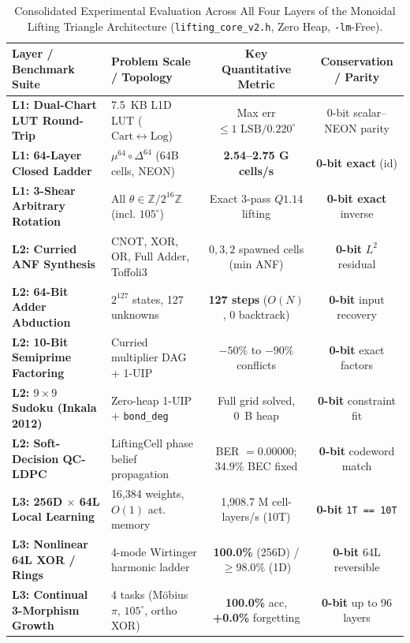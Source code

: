 \documentclass[11pt, a4paper]{article}
\begin{document}
\begin{table}[htbp]
\centering
\small
\caption{Consolidated Experimental Evaluation Across All Four Layers of the Monoidal Lifting Triangle Architecture (\texttt{lifting\_core\_v2.h}, Zero Heap, \texttt{-lm}-Free).}
\label{tab:master_eval}
\begin{tabularx}{\textwidth}{@{}lXcc@{}}
\toprule
\textbf{Layer / Benchmark Suite} & \textbf{Problem Scale / Topology} & \textbf{Key Quantitative Metric} & \textbf{Conservation / Parity} \\
\midrule
\textbf{L1: Dual-Chart LUT Round-Trip} & 7.5~KB L1D LUT ($\mathrm{Cart} \leftrightarrow \mathrm{Log}$) & Max err $\le 1\text{ LSB} / 0.220^\circ$ & 0-bit scalar--NEON parity \\
\textbf{L1: 64-Layer Closed Ladder} & $\mu^{64} \circ \Delta^{64}$ (64B cells, NEON) & \textbf{2.54--2.75 G cells/s} & \textbf{0-bit exact} ($\mathrm{id}$) \\
\textbf{L1: 3-Shear Arbitrary Rotation} & All $\theta \in \mathbb{Z}/2^{16}\mathbb{Z}$ (incl. $105^\circ$) & Exact 3-pass $Q1.14$ lifting & \textbf{0-bit exact} inverse \\
\midrule
\textbf{L2: Curried ANF Synthesis} & CNOT, XOR, OR, Full Adder, Toffoli3 & $0, 3, 2$ spawned cells (min ANF) & \textbf{0-bit} $L^2$ residual \\
\textbf{L2: 64-Bit Adder Abduction} & $2^{127}$ states, 127 unknowns & \textbf{127 steps} ($O(N)$, 0 backtrack) & \textbf{0-bit} input recovery \\
\textbf{L2: 10-Bit Semiprime Factoring} & Curried multiplier DAG + 1-UIP & $-50\%$ to $-90\%$ conflicts & \textbf{0-bit} exact factors \\
\textbf{L2: $9 \times 9$ Sudoku (Inkala 2012)} & Zero-heap 1-UIP + \texttt{bond\_deg} & Full grid solved, 0~B heap & \textbf{0-bit} constraint fit \\
\textbf{L2: Soft-Decision QC-LDPC} & LiftingCell phase belief propagation & BER $= 0.00000$; $34.9\%$ BEC fixed & \textbf{0-bit} codeword match \\
\midrule
\textbf{L3: 256D $\times$ 64L Local Learning} & 16,384 weights, $O(1)$ act. memory & 1,908.7 M cell-layers/s (10T) & \textbf{0-bit} \texttt{1T == 10T} \\
\textbf{L3: Nonlinear 64L XOR / Rings} & 4-mode Wirtinger harmonic ladder & \textbf{100.0\%} (256D) / $\ge 98.0\%$ (1D) & \textbf{0-bit} 64L reversible \\
\textbf{L3: Continual 3-Morphism Growth} & 4 tasks (M\"{o}bius $\pi$, $105^\circ$, ortho XOR) & \textbf{100.0\%} acc, \textbf{+0.0\%} forgetting & \textbf{0-bit} up to 96 layers \\

\end{tabularx}
\end{table}
\end{document}

